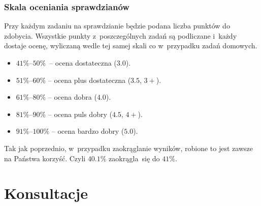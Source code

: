 \documentclass[10pt,t]{beamer}
\begin{document}
\begin{frame}
  \frametitle{Skala oceniania sprawdzianów}


  Przy każdym zadaniu na sprawdzianie będzie podana liczba punktów do
  zdobycia. Wszystkie punkty z~poszczególnych zadań są podliczane i~każdy
  dostaje ocenę, wyliczaną wedle tej samej skali co w~przypadku zadań
  domowych.

  \vspace{-0.3em}



  \begin{itemize}

  \item $41\%\text{--}50\%$~-- ocena dostateczna ($3.0$).

  \item $51\%\text{--}60\%$ -- ocena plus dostateczna ($3.5$, $3+$).

  \item $61\%\text{--}80\%$ -- ocena dobra ($4.0$).

  \item $81\%\text{--}90\%$ -- ocena puls dobry ($4.5$, $4+$).

  \item $91\%\text{--}100\%$ -- ocena bardzo dobry ($5.0$).

  \end{itemize}

  \vspace{-0.3em}



  Tak jak poprzednio, w~przypadku zaokrąglanie wyników, robione to jest
  zawsze na Państwa korzyść. Czyli $40.1\%$ zaokrągla~się do $41\%$.

\end{frame}










\section{Konsultacje}
\end{document}

